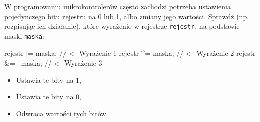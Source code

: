 % 
% 
% 
% 


\dbEntryCheckResults
  W programowaniu mikrokontrolerów często zachodzi potrzeba ustawienia pojedynczego bitu rejestru na 0 lub 1, albo zmiany jego wartości.
  Sprawdź (np. rozpisując ich działanie), które wyrażenie w rejestrze \Verb$rejestr$, na podstawie maski \Verb$maska$:

  \begin{CodeFrame}[c]{0.55\textwidth}
    rejestr |= maska;  // <- Wyrażenie 1
    rejestr ^= maska;  // <- Wyrażenie 2
    rejestr &= ~maska; // <- Wyrażenie 3
  \end{CodeFrame}
  \noindent\begin{minipage}[t]{0.43\textwidth}\vspace{-3pt}\begin{itemize}
    \item Ustawia te bity na 1,
    \item Ustawia te bity na 0,
    \item Odwraca wartości tych bitów.
  \end{itemize}\end{minipage}\hfill
\fi

